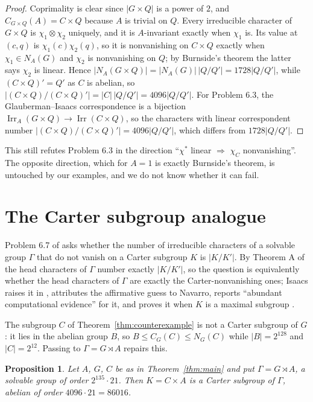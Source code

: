 \documentclass[11pt,a4paper,reqno]{amsart}
\newtheorem{proposition}[theorem]{Proposition}
\theoremstyle{definition}
\theoremstyle{remark}
\newcommand{\Irr}{\operatorname{Irr}}
\begin{document}
\begin{proof}
Coprimality is clear since $|G\times Q|$ is a power of $2$, and
$C_{G\times Q}(A)=C\times Q$ because $A$ is trivial on $Q$.  Every
irreducible character of $G\times Q$ is $\chi_1\otimes\chi_2$ uniquely,
and it is $A$-invariant exactly when $\chi_1$ is.  Its value at
$(c,q)$ is $\chi_1(c)\chi_2(q)$, so it is nonvanishing on $C\times Q$
exactly when $\chi_1\in N_A(G)$ and $\chi_2$ is nonvanishing on $Q$; by
Burnside's theorem the latter says $\chi_2$ is linear.  Hence
$|N_A(G\times Q)|=|N_A(G)|\,|Q/Q'|=1728|Q/Q'|$, while
$(C\times Q)'=Q'$ as $C$ is abelian, so
$|(C\times Q)/(C\times Q)'|=|C|\,|Q/Q'|=4096|Q/Q'|$.  For Problem 6.3,
the Glauberman--Isaacs correspondence is a bijection
$\Irr_A(G\times Q)\to\Irr(C\times Q)$, so the characters with linear
correspondent number $|(C\times Q)/(C\times Q)'|=4096|Q/Q'|$, which
differs from $1728|Q/Q'|$.
\end{proof}

This still refutes Problem 6.3 in the direction
``$\chi^*$ linear $\Rightarrow$ $\chi_C$ nonvanishing''.  The opposite
direction, which for $A=1$ is exactly Burnside's theorem, is untouched
by our examples, and we do not know whether it can fail.

\section{The Carter subgroup analogue}\label{sec:carter}

Problem 6.7 of \cite{navarro-problems} asks whether the number of
irreducible characters of a solvable group $\Gamma$ that do not vanish
on a Carter subgroup $K$ is $|K/K'|$.  By Theorem A of
\cite{isaacs-carter} the head characters of $\Gamma$ number exactly
$|K/K'|$, so the question is equivalently whether the head characters of
$\Gamma$ are exactly the Carter-nonvanishing ones; Isaacs raises it in
\cite[\S6]{isaacs-carter}, attributes the affirmative guess to Navarro,
reports ``abundant computational evidence'' for it, and proves it when
$K$ is a maximal subgroup \cite[Theorem 6.1]{isaacs-carter}.

The subgroup $C$ of Theorem~\ref{thm:counterexample} is not a Carter
subgroup of $G$: it lies in the abelian group $B$, so
$B\le C_G(C)\le N_G(C)$ while $|B|=2^{128}$ and $|C|=2^{12}$.  Passing to
$\Gamma=G\rtimes A$ repairs this.

\begin{proposition}\label{prop:carter}
Let $A$, $G$, $C$ be as in Theorem~\ref{thm:main} and put
$\Gamma=G\rtimes A$, a solvable group of order $2^{135}\cdot21$.  Then
$K=C\times A$ is a Carter subgroup of $\Gamma$, abelian of order
$4096\cdot21=86016$.
\end{proposition}
\end{document}
